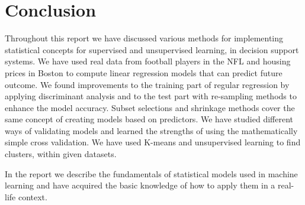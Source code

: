 \chapter{Conclusion} \label{ch:conclussion}
Throughout this report we have discussed various methods for implementing statistical concepts for supervised and unsupervised learning, in decision support systems. We have used real data from football players in the NFL and housing prices in Boston to compute linear regression models that can predict future outcome. We found improvements to the training part of regular regression by applying discriminant analysis and to the test part with re-sampling methods to enhance the model accuracy. Subset selections and shrinkage methods cover the same concept of creating models based on predictors. We have studied different ways of validating models and learned the strengths of using the mathematically simple cross validation. We have used K-means and unsupervised learning to find clusters, within given datasets.

In the report we describe the fundamentals of statistical models used in machine learning and have acquired the basic knowledge of how to apply them in a real-life context.